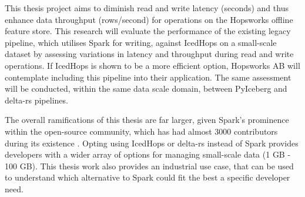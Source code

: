 This thesis project aims to diminish read and write latency (seconds) and thus enhance data throughput (rows/second) for operations on the Hopsworks offline feature store. This research will evaluate the performance of the existing legacy pipeline, which utilises Spark for writing, against IcedHops on a small-scale dataset by assessing variations in latency and throughput during read and write operations. If IcedHops is shown to be a more efficient option, Hopsworks AB will contemplate including this pipeline into their application. The same assessment will be conducted, within the same data scale domain, between PyIceberg and delta-rs pipelines.

The overall ramifications of this thesis are far larger, given Spark's prominence within the open-source community, which has had almost 3000 contributors during its existence \cite{ApacheSparkOpen}. Opting using IcedHops or delta-rs instead of Spark provides developers with a wider array of options for managing small-scale data (1 GB - 100 GB). This thesis work also provides an industrial use case, that can be used to understand which alternative to Spark could fit the best a specific developer need.